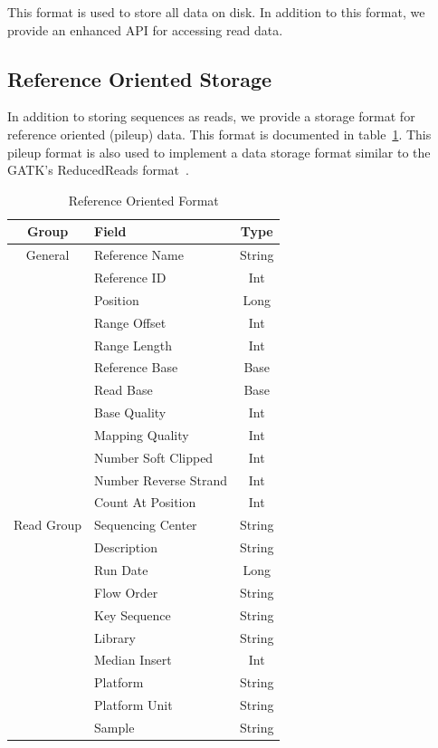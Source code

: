 \documentclass[10pt,twocolumn]{article}
\theoremstyle{plain}
\begin{document}
This format is used to store all data on disk. In addition to this format, we provide an enhanced API for accessing read
data.

\subsection{Reference Oriented Storage}
\label{sec:reference-oriented-storage}

In addition to storing sequences as reads, we provide a storage format for reference oriented (pileup) data. This format
is documented in table~\ref{tab:reference-oriented-format}. This pileup format is also used to implement a data storage
format similar to the GATK's ReducedReads format~\cite{depristo11}.

\begin{table}[h]
\caption{Reference Oriented Format}
\label{tab:reference-oriented-format}
\begin{center}
\begin{tabular}{| c | l | c |}
\hline
\bf Group & \bf Field & \bf Type \\
\hline
General & Reference Name & String \\
 & Reference ID & Int \\
 & Position & Long \\
 & Range Offset & Int \\
 & Range Length & Int \\
 & Reference Base & Base \\
 & Read Base & Base \\
 & Base Quality & Int \\
 & Mapping Quality & Int \\
 & Number Soft Clipped & Int \\
 & Number Reverse Strand & Int \\
 & Count At Position & Int \\
\hline
Read Group & Sequencing Center & String \\
 & Description & String \\
 & Run Date & Long \\
 & Flow Order & String \\
 & Key Sequence & String \\
 & Library & String \\
 & Median Insert & Int \\
 & Platform & String \\
 & Platform Unit & String \\
 & Sample & String \\
\hline
\end{tabular}
\end{center}
\end{table}
\end{document}
